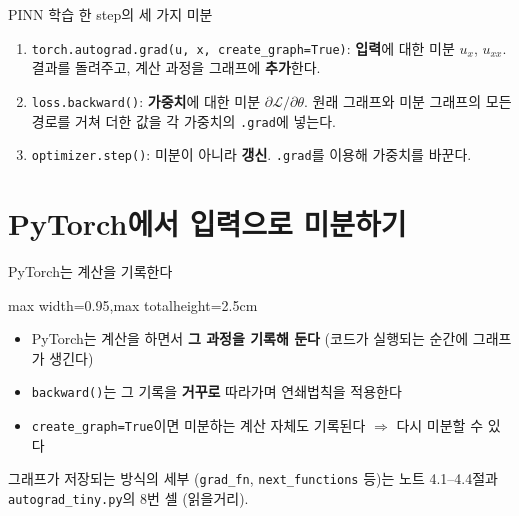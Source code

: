 \documentclass[aspectratio=169,11pt]{beamer}
\newcommand{\loss}{\mathcal{L}}
\newcommand{\figcap}[1]{\par\vskip1mm{\centering\footnotesize\color{black!70}#1\par}}
\begin{document}
\begin{frame}{PINN 학습 한 step의 세 가지 미분}
\begin{keybox}[세 가지 미분]
\begin{enumerate}
\item \texttt{torch.autograd.grad(u, x, create\_graph=True)}: \textbf{입력}에 대한 미분 $u_x$, $u_{xx}$.
결과를 돌려주고, 계산 과정을 그래프에 \textbf{추가}한다.
\vskip1mm
\item \texttt{loss.backward()}: \textbf{가중치}에 대한 미분 $\partial\loss/\partial\theta$.
원래 그래프와 미분 그래프의 모든 경로를 거쳐 더한 값을 각 가중치의 \texttt{.grad}에 넣는다.
\vskip1mm
\item \texttt{optimizer.step()}: 미분이 아니라 \textbf{갱신}. \texttt{.grad}를 이용해 가중치를 바꾼다.
\end{enumerate}
\end{keybox}
\end{frame}

\section{PyTorch에서 입력으로 미분하기}

\begin{frame}{PyTorch는 계산을 기록한다}
\centering
\begin{adjustbox}{max width=0.95\linewidth,max totalheight=2.5cm}
\end{adjustbox}
\vskip3mm
\begin{keybox}
\begin{itemize}
\item PyTorch는 계산을 하면서 \textbf{그 과정을 기록해 둔다} (코드가 실행되는 순간에 그래프가 생긴다)
\item \texttt{backward()}는 그 기록을 \textbf{거꾸로} 따라가며 연쇄법칙을 적용한다
\item \texttt{create\_graph=True}이면 미분하는 계산 자체도 기록된다 $\Rightarrow$ 다시 미분할 수 있다
\end{itemize}
\end{keybox}
\figcap{그래프가 저장되는 방식의 세부 (\texttt{grad\_fn}, \texttt{next\_functions} 등)는 노트 4.1--4.4절과 \texttt{autograd\_tiny.py}의 8번 셀 (읽을거리).}
\end{frame}
\end{document}

